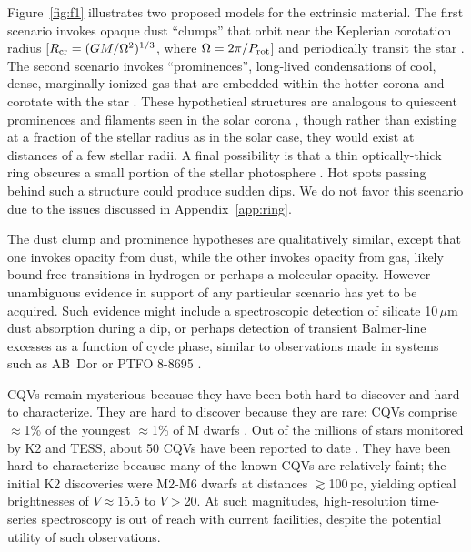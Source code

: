 \documentclass[11pt,twocolumn,tighten]{aastex63}
\begin{document}
Figure~\ref{fig:f1} illustrates two proposed models for the extrinsic
material.  The first scenario invokes opaque dust ``clumps'' that
orbit near the Keplerian corotation radius [$R_{\rm cr} =
(GM/\Omega^2)^{1/3}$, where $\Omega = 2\pi/P_{\rm rot}$] and
periodically transit the star
\citep{2017AJ....153..152S,2023MNRAS.518.4734S}.  The second scenario
invokes ``prominences'', long-lived condensations of cool, dense,
marginally-ionized gas that are embedded within the hotter corona and
corotate with the star
\citep{1989MNRAS.238..657C,2019MNRAS.482.2853J,2022MNRAS.514.5465W}.
These hypothetical structures are analogous to quiescent prominences
and filaments seen in the solar corona \citep[see
e.g.][]{2015ASSL..415.....V}, though rather than existing at a
fraction of the stellar radius as in the solar case, they would exist
at distances of a few stellar radii.  A final possibility is that a thin
optically-thick ring obscures a small portion of the stellar
photosphere \citep{2019ApJ...876..127Z}.  Hot spots passing behind such a structure could produce
sudden dips.  We do not favor this scenario due to the issues
discussed in Appendix~\ref{app:ring}.

The dust clump and prominence hypotheses are qualitatively similar,
except that one invokes opacity from dust, while the other invokes
opacity from gas, likely bound-free transitions in hydrogen or perhaps
a molecular opacity.  However unambiguous evidence in support of any particular
scenario has yet to be acquired.  Such evidence might include a
spectroscopic detection of silicate 10\,$\mu$m dust absorption during
a dip, or perhaps detection of transient Balmer-line excesses as a
function of cycle phase, similar to observations made in systems such
as AB~Dor \citep[see][]{1999ASPC..158..146C} or PTFO 8-8695
\citep{2016ApJ...830...15J}.

CQVs remain mysterious because they have been both hard to discover
and hard to characterize.   They are hard to discover because they are
rare: CQVs comprise $\approx$1\% of the youngest $\approx$1\% of M
dwarfs \citep{2018AJ....155..196R}.  Out of the millions of stars
monitored by K2 and TESS, about 50 CQVs have been reported to date
\citep{2016AJ....152..114R,2017AJ....153..152S,2018AJ....155...63S,2019ApJ...876..127Z,2020AJ....160...86B,2022AJ....163..144G,2023ApJ...945..114P}.
They have been hard to characterize because many of the known CQVs are
relatively faint; the initial K2 discoveries
\citep{2016AJ....152..114R,2017AJ....153..152S} were M2-M6 dwarfs at
distances $\gtrsim$100\,pc, yielding optical brightnesses of
$V$$\approx$15.5 to $V$$>$20.  At such magnitudes, high-resolution
time-series spectroscopy is out of reach with current facilities,
despite the potential utility of such observations.
\end{document}
